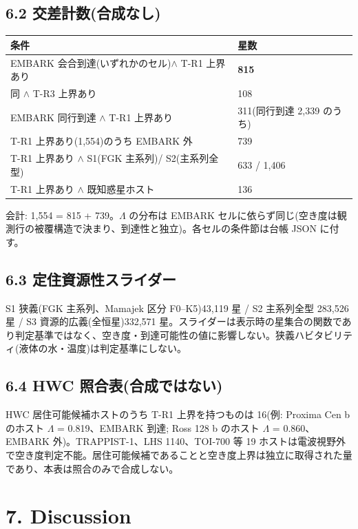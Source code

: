 \documentclass[11pt]{article}
\begin{document}
\subsection*{6.2 交差計数(合成なし)}
{\footnotesize\setlength{\tabcolsep}{3.5pt}\begin{center}\begin{tabular}{ll}
条件 & 星数 \\
\hline
EMBARK 会合到達(いずれかのセル)\(\wedge\) T-R1 上界あり & \textbf{815} \\
同 \(\wedge\) T-R3 上界あり & 108 \\
EMBARK 同行到達 \(\wedge\) T-R1 上界あり & 311(同行到達 2,339 のうち) \\
T-R1 上界あり(1,554)のうち EMBARK 外 & 739 \\
T-R1 上界あり \(\wedge\) S1(FGK 主系列)/ S2(主系列全型) & 633 / 1,406 \\
T-R1 上界あり \(\wedge\) 既知惑星ホスト & 136 \\
\end{tabular}\end{center}}
\noindent 会計: 1,554 = 815 + 739。\(\Lambda\) の分布は EMBARK セルに依らず同じ(空き度は観測行の被覆構造で決まり、到達性と独立)。各セルの条件節は台帳 JSON に付す。\par\smallskip

\subsection*{6.3 定住資源性スライダー}
\noindent S1 狭義(FGK 主系列、Mamajek 区分 F0–K5)43,119 星 / S2 主系列全型 283,526 星 / S3 資源的広義(全恒星)332,571 星。スライダーは表示時の星集合の関数であり判定基準ではなく、空き度・到達可能性の値に影響しない。狭義ハビタビリティ(液体の水・温度)は判定基準にしない。\par\smallskip

\subsection*{6.4 HWC 照合表(合成ではない)}
\noindent HWC 居住可能候補ホストのうち T-R1 上界を持つものは 16(例: Proxima Cen b のホスト \(\Lambda\) = 0.819、EMBARK 到達; Ross 128 b のホスト \(\Lambda\) = 0.860、EMBARK 外)。TRAPPIST-1、LHS 1140、TOI-700 等 19 ホストは電波視野外で空き度判定不能。居住可能候補であることと空き度上界は独立に取得された量であり、本表は照合のみで合成しない。\par\smallskip

\section*{7. Discussion}
\end{document}
